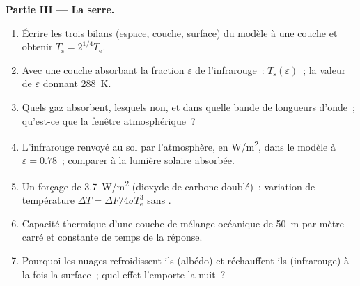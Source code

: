 \begin{problem}
\textbf{Partie III --- La serre.}
\begin{enumerate}[resume]
  \item Écrire les trois bilans (espace, couche, surface) du
        modèle à une couche et obtenir $T_{\text{s}} = 2^{1/4}T_{\text{e}}$.
  \item Avec une couche absorbant la fraction $\varepsilon$ de
        l'infrarouge~: $T_{\text{s}}(\varepsilon)$~; la valeur de $\varepsilon$
        donnant \qty{288}{K}.
  \item Quels gaz absorbent, lesquels non, et dans quelle bande de longueurs
        d'onde~; qu'est-ce que la fenêtre atmosphérique~?
  \item L'infrarouge renvoyé au sol par l'atmosphère,
        en \unit{W/m^2}, dans le modèle à $\varepsilon = 0.78$~; comparer à
        la lumière solaire absorbée.
  \item Un forçage de \qty{3.7}{W/m^2} (dioxyde de carbone doublé)~:
        variation de température $\Delta T = \Delta F/4\sigma T_{\text{e}}^3$
        sans .
  \item Capacité thermique d'une couche de mélange océanique de \qty{50}{m} par mètre
        carré et constante de temps de la réponse.
  \item Pourquoi les nuages refroidissent-ils (albédo) et réchauffent-ils (infrarouge) à la fois la
        surface~; quel effet l'emporte la nuit~?
\end{enumerate}


\end{problem}

